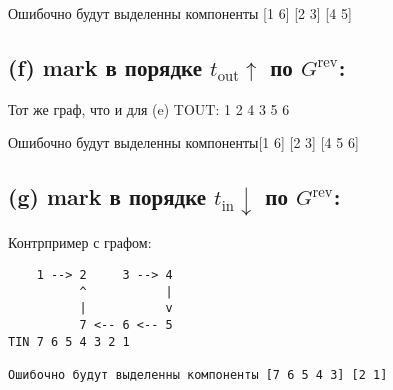 Ошибочно будут выделенны компоненты [1 6] [2 3] [4 5] 


\subsection*{(f) mark в порядке $t_{\text{out}} \uparrow$ по $G^\text{rev}$:}
Тот же граф, что и для (e)
TOUT: 1 2 4 3 5 6

Ошибочно будут выделенны компоненты[1 6] [2 3] [4 5 6] 


\subsection*{(g) mark в порядке $t_{\text{in}} \downarrow$ по $G^\text{rev}$:}
Контрпример с графом:
\begin{verbatim}
    1 --> 2     3 --> 4
          ^           |
          |           v
          7 <-- 6 <-- 5
TIN 7 6 5 4 3 2 1

Ошибочно будут выделенны компоненты [7 6 5 4 3] [2 1] 

\end{verbatim}
